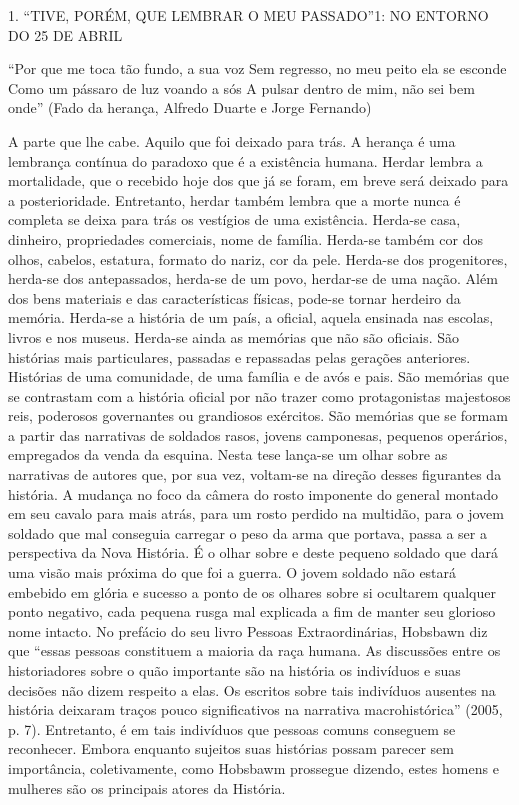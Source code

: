 \documentclass[../DISSERTACAO_MAIN.tex]{subfiles}
\begin{document}
1. “TIVE, PORÉM, QUE LEMBRAR O MEU PASSADO”1: NO ENTORNO DO 25 DE ABRIL


“Por que me toca tão fundo, a sua voz
Sem regresso, no meu peito ela se esconde
Como um pássaro de luz voando a sós
A pulsar dentro de mim, não sei bem onde”
(Fado da herança, Alfredo Duarte e Jorge Fernando)




A parte que lhe cabe. Aquilo que foi deixado para trás. A herança é uma lembrança contínua do paradoxo que é a existência humana. Herdar lembra a mortalidade, que o recebido hoje dos que já se foram, em breve será deixado para a posterioridade. Entretanto, herdar também lembra que a morte nunca é completa se deixa para trás os vestígios de uma existência. Herda-se casa, dinheiro, propriedades comerciais, nome de família. Herda-se também cor dos olhos, cabelos, estatura, formato do nariz, cor da pele. Herda-se dos progenitores, herda-se dos antepassados, herda-se de um povo, herdar-se de uma nação. 
Além dos bens materiais e das características físicas, pode-se tornar herdeiro da memória. Herda-se a história de um país, a oficial, aquela ensinada nas escolas, livros e nos museus. Herda-se ainda as memórias que não são oficiais. São histórias mais particulares, passadas e repassadas pelas gerações anteriores. Histórias de uma comunidade, de uma família e de avós e pais. São memórias que se contrastam com a história oficial por não trazer como protagonistas majestosos reis, poderosos governantes ou grandiosos exércitos. São memórias que se formam a partir das narrativas de soldados rasos, jovens camponesas, pequenos operários, empregados da venda da esquina.
Nesta tese lança-se um olhar sobre as narrativas de autores que, por sua vez, voltam-se na direção desses figurantes da história. A mudança no foco da câmera do rosto imponente do general montado em seu cavalo para mais atrás, para um rosto perdido na multidão, para o jovem soldado que mal conseguia carregar o peso da arma que portava, passa a ser a perspectiva da Nova História. É o olhar sobre e deste pequeno soldado que dará uma visão mais próxima do que foi a guerra. O jovem soldado não estará embebido em glória e sucesso a ponto de os olhares sobre si ocultarem qualquer ponto negativo, cada pequena rusga mal explicada a fim de manter seu glorioso nome intacto. 
No prefácio do seu livro Pessoas Extraordinárias, Hobsbawn diz que “essas pessoas constituem a maioria da raça humana. As discussões entre os historiadores sobre o quão importante são na história os indivíduos e suas decisões não dizem respeito a elas. Os escritos sobre tais indivíduos ausentes na história deixaram traços pouco significativos na narrativa macrohistórica” (2005, p. 7). Entretanto, é em tais indivíduos que pessoas comuns conseguem se reconhecer. Embora enquanto sujeitos suas histórias possam parecer sem importância, coletivamente, como Hobsbawm prossegue dizendo, estes homens e mulheres são os principais atores da História. 
\end{document}
